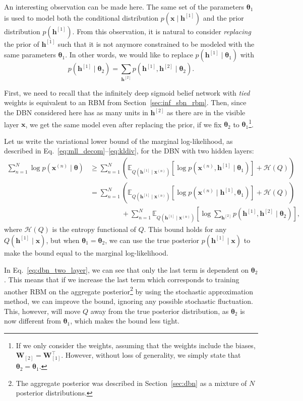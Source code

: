 \documentclass[dissertation,nocontribution,draft*]{aaltoseries}
\newcommand{\qlay}[1]{\left[#1\right]}
\newcommand{\vect}[1]{\mathbf{#1}}
\newcommand{\vects}[1]{\boldsymbol{#1}}
\newcommand{\matr}[1]{\mathbf{#1}}
\newcommand{\vh}[0]{\vect{h}}
\newcommand{\vx}[0]{\vect{x}}
\newcommand{\mW}[0]{\matr{W}}
\newcommand{\TT}[0]{{\vects{\theta}}}
\newcommand{\HH}[0]{\mathcal{H}}
\newcommand{\E}[0]{\mathbb{E}}
\begin{document}
An interesting observation can be made here.  The same set
of the parameters $\TT_1$ is used to model both the
conditional distribution $p(\vx \mid \vh^{\qlay{1}})$ and the
prior distribution $p(\vh^{\qlay{1}})$. From this observation, it
is natural to consider \textit{replacing} the prior of
$\vh^{\qlay{1}}$ such that it is not anymore constrained to be
modeled with the same parameters $\TT_1$.
In other words, we would like to replace
$p(\vh^{\qlay{1}} \mid \TT_1)$ with
\[
p(\vh^{\qlay{1}} \mid \TT_2) = \sum_{\vh^{\qlay{2}}}
p(\vh^{\qlay{1}},
\vh^{\qlay{2}} \mid \TT_2).
\]

First, we need to recall that the infinitely deep sigmoid
belief network with \textit{tied} weights is equivalent to
an RBM from Section~\ref{sec:inf_sbn_rbm}. Then, since the DBN
considered here has as many units in $\vh^{\qlay{2}}$ as there
are in the visible layer $\vx$, we get the same model even
after replacing the prior, if we fix $\TT_2$ to
$\TT_1$\footnote{ If we only consider the weights, assuming
that the weights include the biases,
$\mW_{\qlay{2}}=\mW_{\qlay{1}}^\top$.
However, without loss of generality, we simply state that
$\TT_2=\TT_1$.  }.

Let us write the variational lower bound of the marginal
log-likelihood, as described in
Eq.~\eqref{eq:mll_decom}--\eqref{eq:kldiv}, for the DBN with
two hidden layers:
\begin{align}
    \label{eq:dbn_two_layer}
    \sum_{n=1}^N \log p(\vx^{(n)} \mid \TT) &\geq
    \sum_{n=1}^N \left(\E_{Q(\vh^{\qlay{1}} \mid \vx^{(n)})} \left[
    \log p(\vx^{(n)}, \vh^{\qlay{1}} \mid \TT_1)
    \right] + \HH(Q)\right) 
    \nonumber \\
    &= \sum_{n=1}^N \left(\E_{Q(\vh^{\qlay{1}} \mid \vx^{(n)})} \left[
    \log p(\vx^{(n)} \mid \vh^{\qlay{1}}, \TT_1) \right] +
    \HH(Q)\right)
    \nonumber \\
    &\phantom{= \sum_{n=1}^N} + \sum_{n=1}^N
    \E_{Q(\vh^{\qlay{1}} \mid \vx^{(n)})} \left[ \log
    \sum_{\vh^{\qlay{2}}} p(\vh^{\qlay{1}}, \vh^{\qlay{2}} \mid \TT_2) \right]
    ,
\end{align}
where $\HH(Q)$ is the entropy functional of $Q$. This bound
holds for any $Q(\vh^{\qlay{1}} \mid \vx)$, but when $\TT_1 =
\TT_2$, we can use the true posterior $p(\vh^{\qlay{1}} \mid
\vx)$ to make the bound equal to the marginal
log-likelihood.

In Eq.~\eqref{eq:dbn_two_layer}, we can see that only the
last term is dependent on $\TT_2$. This means that if we
increase the last term which corresponds to training another
RBM on the aggregate posterior\footnote{The aggregate
posterior was described in Section~\ref{sec:dbn} as a
mixture of $N$ posterior distributions.} by using the
stochastic approximation method, we can improve the bound,
ignoring any possible stochastic fluctuation. 
This, however, will move $Q$ away from the true posterior
distribution, as $\TT_2$ is now different from $\TT_1$,
which makes the bound less tight.
\end{document}
